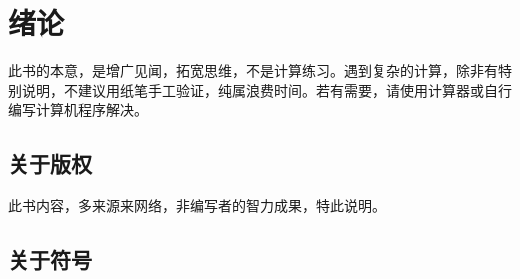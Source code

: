 
\chapter{绪论}
\label{chap:introduction}

此书的本意，是增广见闻，拓宽思维，不是计算练习。遇到复杂的计算，除非有特别说明，不建议用纸笔手工验证，纯属浪费时间。若有需要，请使用计算器或自行编写计算机程序解决。

\section{关于版权}
\label{sec:copyright}

此书内容，多来源来网络，非编写者的智力成果，特此说明。

\section{关于符号}
\label{sec:symbol}


